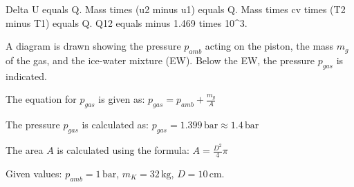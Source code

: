 Delta U equals Q.  
Mass times (u2 minus u1) equals Q.  
Mass times cv times (T2 minus T1) equals Q.  
Q12 equals minus 1.469 times 10^3.

A diagram is drawn showing the pressure \( p_{amb} \) acting on the piston, the mass \( m_g \) of the gas, and the ice-water mixture (EW). Below the EW, the pressure \( p_{gas} \) is indicated.  

The equation for \( p_{gas} \) is given as:  
\( p_{gas} = p_{amb} + \frac{m_g}{A} \)  

The pressure \( p_{gas} \) is calculated as:  
\( p_{gas} = 1.399 \, \text{bar} \approx 1.4 \, \text{bar} \)  

The area \( A \) is calculated using the formula:  
\( A = \frac{D^2}{4} \pi \)  

Given values:  
\( p_{amb} = 1 \, \text{bar} \), \( m_K = 32 \, \text{kg} \), \( D = 10 \, \text{cm} \).
